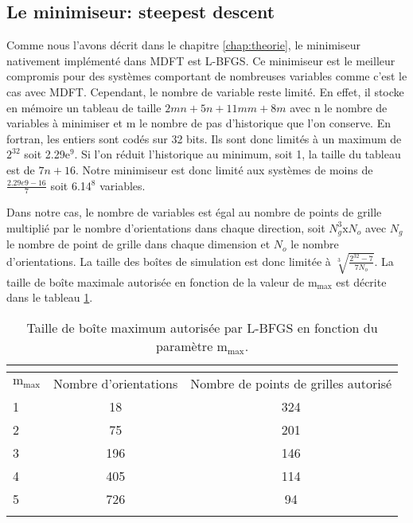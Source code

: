\subsection{Le minimiseur: steepest descent}
Comme nous l'avons décrit dans le chapitre \ref{chap:theorie}, le minimiseur nativement implémenté dans MDFT est L-BFGS. Ce minimiseur est le meilleur compromis pour des systèmes comportant de nombreuses variables comme c'est le cas avec MDFT. Cependant, le nombre de variable reste limité. En effet, il stocke en mémoire un tableau de taille $2mn + 5n + 11mm + 8m$ avec n le nombre de variables à minimiser et m le nombre de pas d'historique que l'on conserve. En fortran, les entiers sont codés sur 32 bits. Ils sont donc limités à un maximum de $2^{32}$ soit 2.29e$^9$. Si l'on réduit l'historique au minimum, soit 1, la taille du tableau est de $7n+16$. Notre minimiseur est donc limité aux systèmes de moins de $\frac{2.29e9-16}{7}$ soit 6.14$^{8}$ variables. 

Dans notre cas, le nombre de variables est égal au nombre de points de grille multiplié par le nombre d'orientations dans chaque direction, soit $N_g^3 \mathrm{x} N_o$ avec $N_g$ le nombre de point de grille dans chaque dimension et $N_o$ le nombre d'orientations. La taille des boîtes de simulation est donc limitée à $\sqrt[3]{\frac{2^{32}-7}{7N_o}}$. La taille de boîte maximale autorisée en fonction de la valeur de $\mathrm{m}_\mathrm{max}$ est décrite dans le tableau \ref{tab:taille_boîte_max}.



\begin{table}[ht]
 \centering
  \begin{tabular}{l | c | c }
    \hline \multicolumn{3}{c}{} \\[-1em]\hline
    $\mathrm{m}_\mathrm{max}$ & Nombre d'orientations & Nombre de points de grilles autorisé \\
    \hline
    1  & 18 & 324 \\
    2  & 75 & 201 \\
    3  & 196 & 146 \\
    4  & 405 & 114 \\
    5  & 726 & 94 \\
    \hline \multicolumn{3}{c}{} \\[-1em]\hline
  \end{tabular}
  \caption{Taille de boîte maximum autorisée par L-BFGS en fonction du paramètre $\mathrm{m}_\mathrm{max}$.}
  \label{tab:taille_boîte_max}  
\end{table}


